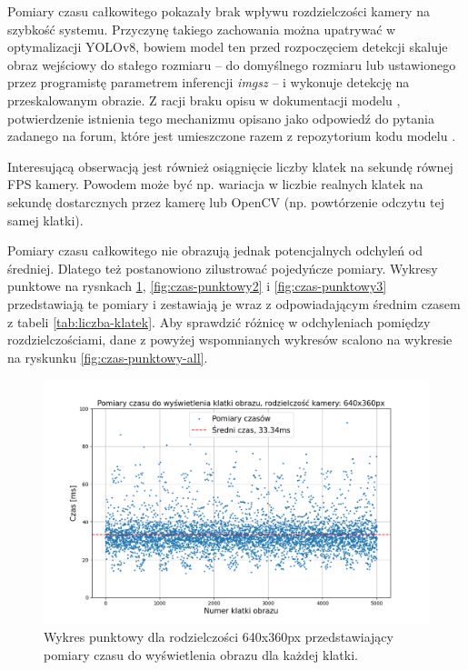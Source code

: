 Pomiary czasu całkowitego pokazały brak wpływu rozdzielczości kamery na szybkość systemu. Przyczynę takiego zachowania można upatrywać w optymalizacji YOLOv8, bowiem model ten przed rozpoczęciem detekcji skaluje obraz wejściowy do stałego rozmiaru -- do domyślnego rozmiaru lub ustawionego przez programistę parametrem inferencji \emph{imgsz} -- i wykonuje detekcję na przeskalowanym obrazie. Z racji braku opisu w dokumentacji modelu \cite{yolo_docs}, potwierdzenie istnienia tego mechanizmu opisano jako odpowiedź do pytania zadanego na forum, które jest umieszczone razem z repozytorium kodu modelu \cite{github_imgsz}.

Interesującą obserwacją jest również osiągnięcie liczby klatek na sekundę równej FPS kamery. Powodem może być np. wariacja w liczbie realnych klatek na sekundę dostarcznych przez kamerę lub OpenCV (np. powtórzenie odczytu tej samej klatki).

Pomiary czasu całkowitego nie obrazują jednak potencjalnych odchyleń od średniej. Dlatego też postanowiono zilustrować pojedyńcze pomiary. Wykresy punktowe na rysnkach \ref{fig:czas-punktowy1}, \ref{fig:czas-punktowy2} i \ref{fig:czas-punktowy3} przedstawiają te pomiary i zestawiają je wraz z odpowiadającym średnim czasem z tabeli \ref{tab:liczba-klatek}. Aby sprawdzić różnicę w odchyleniach pomiędzy rozdzielczościami, dane z powyżej wspomnianych wykresów scalono na wykresie na ryskunku \ref{fig:czas-punktowy-all}.  


\begin{figure}[H]
    \centering
    \includegraphics[width=\linewidth]{r_test_szybkosci/punkty/1.png}
    \caption{Wykres punktowy dla rodzielczości 640x360px przedstawiający pomiary czasu do wyświetlenia obrazu dla każdej klatki.}
    \label{fig:czas-punktowy1}    
\end{figure}


